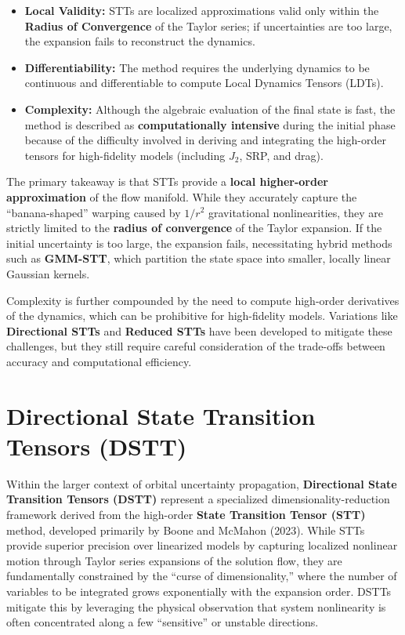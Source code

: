\documentclass[
  letterpaper,
  DIV=11,
  numbers=noendperiod,
  oneside]{scrartcl}
\begin{document}
\begin{itemize}
\item
  \textbf{Local Validity:} STTs are localized approximations valid only
  within the \textbf{Radius of Convergence} of the Taylor series; if
  uncertainties are too large, the expansion fails to reconstruct the
  dynamics.
\item
  \textbf{Differentiability:} The method requires the underlying
  dynamics to be continuous and differentiable to compute Local Dynamics
  Tensors (LDTs).
\item
  \textbf{Complexity:} Although the algebraic evaluation of the final
  state is fast, the method is described as \textbf{computationally
  intensive} during the initial phase because of the difficulty involved
  in deriving and integrating the high-order tensors for high-fidelity
  models (including \(J_2\), SRP, and drag).
\end{itemize}

The primary takeaway is that STTs provide a \textbf{local higher-order
approximation} of the flow manifold. While they accurately capture the
``banana-shaped'' warping caused by \(1/r^2\) gravitational
nonlinearities, they are strictly limited to the \textbf{radius of
convergence} of the Taylor expansion. If the initial uncertainty is too
large, the expansion fails, necessitating hybrid methods such as
\textbf{GMM-STT}, which partition the state space into smaller, locally
linear Gaussian kernels.

Complexity is further compounded by the need to compute high-order
derivatives of the dynamics, which can be prohibitive for high-fidelity
models. Variations like \textbf{Directional STTs} and \textbf{Reduced
STTs} have been developed to mitigate these challenges, but they still
require careful consideration of the trade-offs between accuracy and
computational efficiency.

\section{Directional State Transition Tensors
(DSTT)}\label{directional-state-transition-tensors-dstt}

Within the larger context of orbital uncertainty propagation,
\textbf{Directional State Transition Tensors (DSTT)} represent a
specialized dimensionality-reduction framework derived from the
high-order \textbf{State Transition Tensor (STT)} method, developed
primarily by Boone and McMahon (2023). While STTs provide superior
precision over linearized models by capturing localized nonlinear motion
through Taylor series expansions of the solution flow, they are
fundamentally constrained by the ``curse of dimensionality,'' where the
number of variables to be integrated grows exponentially with the
expansion order. DSTTs mitigate this by leveraging the physical
observation that system nonlinearity is often concentrated along a few
``sensitive'' or unstable directions.
\end{document}
